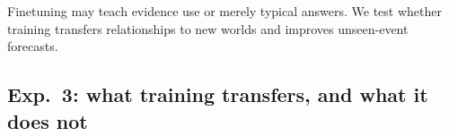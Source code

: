\documentclass{article}
\begin{document}
Finetuning may teach evidence use or merely typical answers. We test whether
training transfers relationships to new worlds and improves unseen-event forecasts.

\subsection{Exp.~3: what training transfers, and what it does not}
\label{sec:exp3}


\newcommand{\transfergridlines}{15}
%
%
\providecommand{\transfergridlines}{13}
\end{document}
